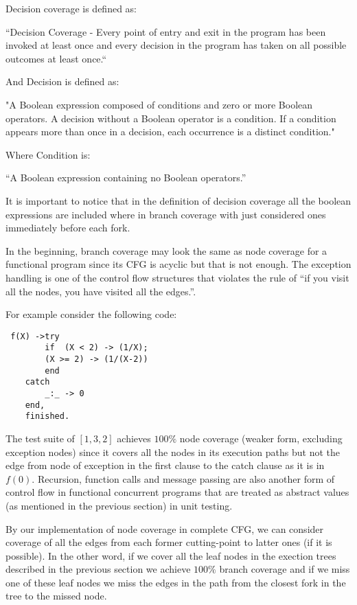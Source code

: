 \documentclass[12pt,a4paper]{report}
\begin{document}
Decision coverage is defined as:

“Decision Coverage - Every point of entry and exit in the program has been invoked at least once and every decision in the program has taken on all possible outcomes at least once.“\cite{cast-10}

And Decision is defined as:

"A Boolean expression composed of conditions and zero or more Boolean operators. A decision without a Boolean operator is a condition. If a condition appears more than once in a decision, each occurrence is a distinct condition."\cite{cast-10}

Where Condition is:

“A Boolean expression containing no Boolean operators.”\cite{cast-10}

It is important to notice that in the definition of decision coverage all the boolean expressions are included where in branch coverage with just considered ones immediately before each fork.

In the beginning, branch coverage may look the same as node coverage for a functional program since its CFG is acyclic but that is not enough. The exception handling is one of the control flow structures that violates the rule of “if you visit all the nodes, you have visited all the edges.”. 

For example consider the following code:
 
\begin{lstlisting}
 f(X) ->try
	    if  (X < 2) -> (1/X);
		(X >= 2) -> (1/(X-2)) 
	    end
	catch  
	    _:_ -> 0
	end,
	finished. 
\end{lstlisting}

The test suite of $[1,3,2]$ achieves $100\%$ node coverage (weaker form, excluding exception nodes) since it covers all the nodes in its execution
 paths but not the edge from node of exception in the first clause to the catch clause as it is in $f(0)$. Recursion, function calls and message passing
 are also another form of control flow in functional concurrent programs that are treated as abstract values (as mentioned in the previous section) in
 unit testing.

By our implementation of node coverage in complete CFG, we can consider coverage of all the edges from
 each former cutting-point to latter ones (if it is possible). In the other word, if we cover all the leaf nodes in the exection trees described in the
 previous section we achieve $100\%$ branch coverage and if we miss one of these leaf nodes we miss the edges in the path from the closest fork in the
 tree to the missed node.
\end{document}
